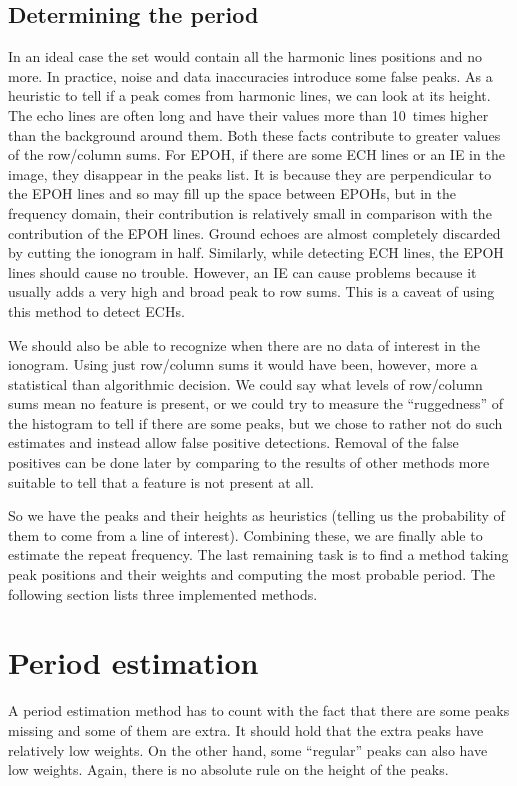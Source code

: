 \subsection{Determining the period}
In an ideal case the set would contain all the harmonic lines positions and no more. In practice, noise and data inaccuracies introduce some false peaks. As a heuristic to tell if a peak comes from harmonic lines, we can look at its height. The echo lines are often long and have their values more than 10~times higher than the background around them. Both these facts contribute to greater values of the row/column sums. For EPOH, if there are some ECH lines or an IE in the image, they disappear in the peaks list. It is because they are perpendicular to the EPOH lines and so may fill up the space between EPOHs, but in the frequency domain, their contribution is relatively small in comparison with the contribution of the EPOH lines. Ground echoes are almost completely discarded by cutting the ionogram in half. Similarly, while detecting ECH lines, the EPOH lines should cause no trouble. However, an IE can cause problems because it usually adds a very high and broad peak to row sums. This is a caveat of using this method to detect ECHs.

We should also be able to recognize when there are no data of interest in the ionogram. Using just row/column sums it would have been, however, more a statistical than algorithmic decision. We could say what levels of row/column sums mean no feature is present, or we could try to measure the ``ruggedness'' of the histogram to tell if there are some peaks, but we chose to rather not do such estimates and instead allow false positive detections. Removal of the false positives can be done later by comparing to the results of other methods more suitable to tell that a feature is not present at all. 

So we have the peaks and their heights as heuristics (telling us the probability of them to come from a line of interest). Combining these, we are finally able to estimate the repeat frequency. The last remaining task is to find a method taking peak positions and their weights and computing the most probable period. The following section lists three implemented methods.

\section{Period estimation}
A period estimation method has to count with the fact that there are some peaks missing and some of them are extra. It should hold that the extra peaks have relatively low weights. On the other hand, some ``regular'' peaks can also have low weights. Again, there is no absolute rule on the height of the peaks.

